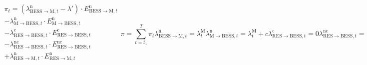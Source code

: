 \begin{subequations}%
  \label{eq:beneficio}

  \begin{equation}
    \begin{split}
      \pi_{t}
      = \left(\lambda^{\mathrm{n}}_{\mathrm{BESS} \rightarrow \mathrm{M}, t} - \lambda'\right)
      \cdot E^{\mathrm{n}}_{\mathrm{BESS} \rightarrow \mathrm{M}, t}\\
      - \lambda^{\mathrm{n}}_{\mathrm{M} \rightarrow \mathrm{BESS}, t}
      \cdot E^{\mathrm{n}}_{\mathrm{M} \rightarrow \mathrm{BESS}, t}\\
      - \lambda^{\mathrm{c}}_{\mathrm{RES} \rightarrow \mathrm{BESS}, t}
      \cdot E^{\mathrm{c}}_{\mathrm{RES} \rightarrow \mathrm{BESS}, t}\\
      - \lambda^{\mathrm{nc}}_{\mathrm{RES} \rightarrow \mathrm{BESS}, t}
      \cdot E^{\mathrm{nc}}_{\mathrm{RES} \rightarrow \mathrm{BESS}, t}\\
      + \lambda^{\mathrm{n}}_{\mathrm{RES} \rightarrow \mathrm{M}, t}
      \cdot E^{\mathrm{n}}_{\mathrm{RES} \rightarrow \mathrm{M}, t}\\
    \end{split}
  \end{equation}

  \begin{equation}
    \pi = \sum_{t = t_{1}}^{T} \pi_{t}
  \end{equation}

  \begin{equation}
    \lambda^{\mathrm{n}}_{\mathrm{BESS} \rightarrow \mathrm{M}, t} = \lambda^{\mathrm{M}}_{t}
  \end{equation}

  \begin{equation}
    \lambda^{\mathrm{n}}_{\mathrm{M} \rightarrow \mathrm{BESS}, t} = \lambda^{\mathrm{M}}_{t} + c
  \end{equation}

  \begin{equation}
    \lambda^{\mathrm{c}}_{\mathrm{RES} \rightarrow \mathrm{BESS}, t} = 0
  \end{equation}

  \begin{equation}
    \lambda^{\mathrm{nc}}_{\mathrm{RES} \rightarrow \mathrm{BESS}, t} =
    \begin{cases}
      \lambda^{\mathrm{M}}_{t} & \text{si } \exists \, \gamma \land \lambda^{\mathrm{M}}_{t} \ge \lambda^{\mathrm{O}}_{\mathrm{RES}, t} \\
      0                        & \text{sino}                                                                                            \\
    \end{cases}
  \end{equation}


\end{subequations}
